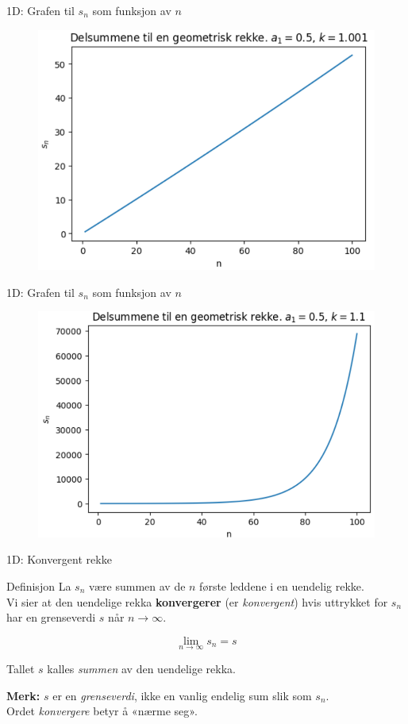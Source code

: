 \cyanheader
\begin{frame}[fragile]{1D:  Grafen til $s_n$ som funksjon av $n$}
\begin{figure}
    \centering
    \includegraphics[width=0.7\linewidth]{R2K1D-5.png}
\end{figure}
\end{frame}

\cyanheader
\begin{frame}[fragile]{1D:  Grafen til $s_n$ som funksjon av $n$}
\begin{figure}
    \centering
    \includegraphics[width=0.7\linewidth]{R2K1D-6.png}
\end{figure}
\end{frame}

\blueheader
\begin{frame}{1D: Konvergent rekke}

\begin{blue*}{Definisjon}
La $s_n$ være summen av de $n$ første leddene i en uendelig rekke.  \\


Vi sier at den uendelige rekka \textbf{konvergerer} (er \emph{konvergent}) hvis uttrykket for $s_n$ har en grenseverdi $s$ når $n \to \infty$.  

\[
\lim_{n \to \infty} s_n = s
\]

Tallet $s$ kalles \emph{summen} av den uendelige rekka.  

\medskip
\textbf{Merk:} $s$ er en \emph{grenseverdi}, ikke en vanlig endelig sum slik som $s_n$.\\


Ordet \emph{konvergere} betyr å «nærme seg».
\end{blue*}
\end{frame}

